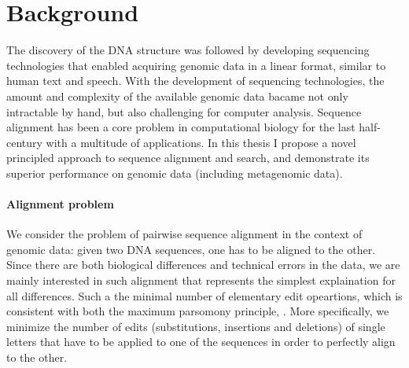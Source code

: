 \section*{Background}

The discovery of the DNA structure\citep{watson1953structure} was followed by
developing sequencing technologies that enabled acquiring genomic data in a
linear format, similar to human text and speech. With the development of
sequencing technologies, the amount and complexity of the available genomic data
bacame not only intractable by hand, but also challenging for computer analysis.
Sequence alignment has been a core problem in computational biology for the last
half-century with a multitude of applications. In this thesis I propose a novel
principled approach to sequence alignment and search, and demonstrate its
superior performance on genomic data (including metagenomic data).

\paragraph{Alignment problem}
We consider the problem of pairwise sequence alignment in the context of genomic
data: given two DNA sequences, one has to be aligned to the other. Since there
are both biological differences and technical errors in the data, we are mainly
interested in such alignment that represents the simplest explaination for all
differences. Such a the  minimal number of elementary edit opeartions, which is
consistent with both the maximum parsomony principle, . More specifically, we
minimize the number of edits (substitutions, insertions and deletions) of single
letters that have to be applied to one of the sequences in order to perfectly
align to the other.

